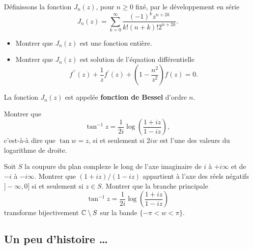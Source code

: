 \begin{exer}
Définissons la fonction $J_n(z)$, pour $n \geq 0$ fixé, par le développement en série
\[J_n(z)=\sum_{k=0}^\infty \frac{(-1)^k z^{n+2 k}}{k!(n+k)! 2^{n+2k}}.\]
\begin{itemize}
\item Montrer que $J_n(z)$ est une fonction entière.
\item Montrer que $J_n(z)$ est solution de l'équation différentielle
\[f^{\prime \prime}(z) + \frac{1}{z}f^\prime (z) + \left(1-\frac{n^2}{z^2}\right) f(z)=0.\]
\end{itemize}
La fonction $J_n(z)$ est appelée \textbf{fonction de Bessel} d'ordre $n$.
\end{exer}

\begin{exer}
Montrer que 
\[\tan^{-1} z= \frac{1}{2 i} \log \left(\frac{1 + i z}{1-iz}\right),\]
c'est-à-à dire que $\tan w=z$, si et seulement si $2 i w$ est l'une des valeurs du logarithme de droite.
\end{exer}

\begin{exer}
Soit $S$ la coupure du plan complexe le long de l'axe imaginaire de $i$ à $+i\infty$ et de $-i$ à $-i \infty$. Montrer que $(1+iz)/(1-iz)$ appartient à l'axe des réels négatifs $]-\infty, 0]$ si et seulement si $z \in S$. Montrer que la branche principale 
\[\tan^{-1} z= \frac{1}{2 i} \log \left(\frac{1 + i z}{1-iz}\right)\]
transforme bijectivement $\mathbb{C} \setminus S$ sur la bande $\{-\pi < w <\pi \}$.
\end{exer}

\newpage 
\subsection*{Un peu d'histoire \dots}

